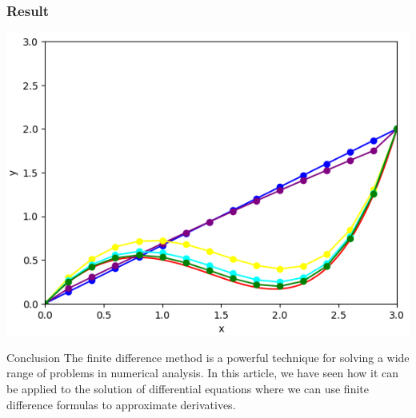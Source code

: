 \documentclass{beamer}
\begin{document}
\begin{frame}
  \frametitle{Result}
  \begin{center}
    \includegraphics[width=1.0\textwidth]{graph.png}
  \end{center}
\end{frame}

\begin{frame}{Conclusion}
The finite difference method is a powerful technique for solving a wide range
of problems in numerical analysis. In this article, we have seen how it can be
applied to the solution of differential equations where we can use finite difference
formulas to approximate derivatives.
\end{frame}
\end{document}
